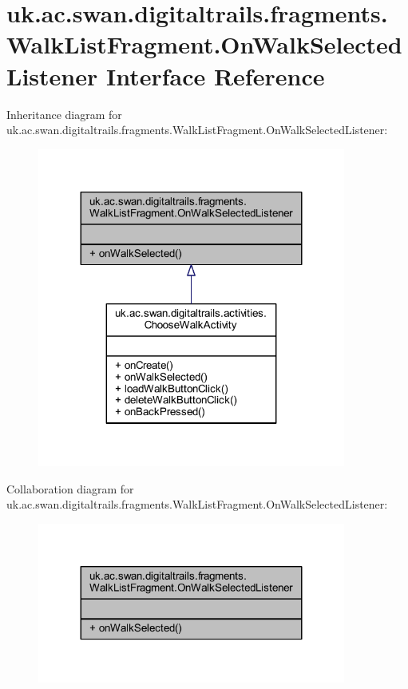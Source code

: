 \hypertarget{interfaceuk_1_1ac_1_1swan_1_1digitaltrails_1_1fragments_1_1_walk_list_fragment_1_1_on_walk_selected_listener}{\section{uk.\+ac.\+swan.\+digitaltrails.\+fragments.\+Walk\+List\+Fragment.\+On\+Walk\+Selected\+Listener Interface Reference}
\label{interfaceuk_1_1ac_1_1swan_1_1digitaltrails_1_1fragments_1_1_walk_list_fragment_1_1_on_walk_selected_listener}
}


Inheritance diagram for uk.\+ac.\+swan.\+digitaltrails.\+fragments.\+Walk\+List\+Fragment.\+On\+Walk\+Selected\+Listener\+:
\nopagebreak
\begin{figure}[H]
\begin{center}
\leavevmode
\includegraphics[width=287pt]{interfaceuk_1_1ac_1_1swan_1_1digitaltrails_1_1fragments_1_1_walk_list_fragment_1_1_on_walk_selected_listener__inherit__graph}
\end{center}
\end{figure}


Collaboration diagram for uk.\+ac.\+swan.\+digitaltrails.\+fragments.\+Walk\+List\+Fragment.\+On\+Walk\+Selected\+Listener\+:
\nopagebreak
\begin{figure}[H]
\begin{center}
\leavevmode
\includegraphics[width=287pt]{interfaceuk_1_1ac_1_1swan_1_1digitaltrails_1_1fragments_1_1_walk_list_fragment_1_1_on_walk_selected_listener__coll__graph}
\end{center}
\end{figure}

